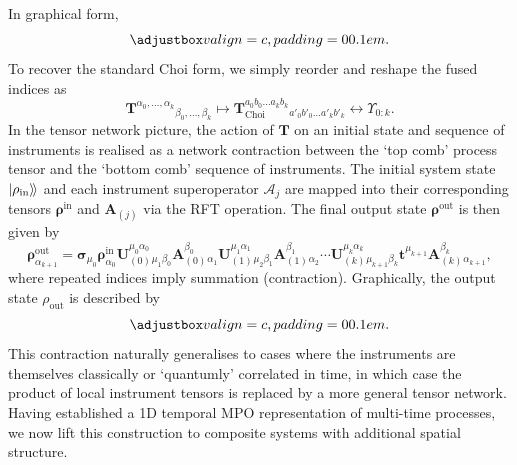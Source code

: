 In graphical form,
\begin{equation}
    \valignbox{}.
\end{equation}
To recover the standard Choi form, we simply reorder and reshape the fused indices as
\begin{equation}\label{eq:pt-tensor-to-choi}
    \mathbf{T}^{\alpha_0,\dots,\alpha_k}{}_{\beta_0,\dots,\beta_k} \mapsto \mathbf{T}_{\mathrm{Choi}}^{a_0b_0\dots a_kb_k}{}_{a'_0b'_0\dots a'_kb'_k} \longleftrightarrow \Upsilon_{0:k}.
\end{equation}
In the tensor network picture, the action of \(\mathbf{T}\) on an initial state and sequence of instruments is realised as a network contraction between the `top comb' process tensor and the `bottom comb' sequence of instruments. The initial system state \(| \rho_\mathrm{in} \rangle \! \rangle\) and each instrument superoperator \(\mathcal{A}_j\) are mapped into their corresponding tensors \(\pmb{\rho}^\mathrm{in}\) and \(\mathbf{A}_{(j)}\) via the RFT operation. The final output state \(\pmb{\rho}^\mathrm{out}\) is then given by
\begin{equation}
    \pmb{\rho}^\mathrm{out}_{\alpha_{k+1}} = \pmb{\sigma}_{\mu_0}\pmb{\rho}^\mathrm{in}_{\alpha_0}\mathbf{U}_{(0)}^{\mu_0\alpha_0}{}_{\mu_1\beta_0}\mathbf{A}_{(0)}^{\beta_0}{}_{\alpha_1}\mathbf{U}_{(1)}^{\mu_1\alpha_1}{}_{\mu_2\beta_1}\mathbf{A}_{(1)}^{\beta_1}{}_{\alpha_2}\cdots\mathbf{U}_{(k)}^{\mu_k\alpha_k}{}_{\mu_{k+1}\beta_k}\mathbf{t}^{\mu_{k+1}}\mathbf{A}_{(k)}^{\beta_k}{}_{\alpha_{k+1}},
\end{equation}
where repeated indices imply summation (contraction). Graphically, the output state \(\rho_\mathrm{out}\) is described by
\begin{equation}
    \valignbox{}.
\end{equation}
This contraction naturally generalises to cases where the instruments are themselves classically or `quantumly' correlated in time, in which case the product of local instrument tensors is replaced by a more general tensor network. Having established a 1D temporal MPO representation of multi-time processes, we now lift this construction to composite systems with additional spatial structure.

